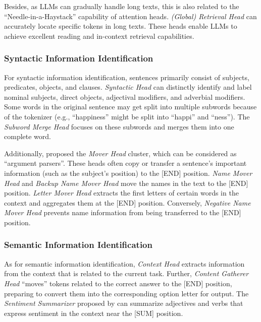 \documentclass[12pt,letterpaper]{article}
\begin{document}
Besides, as LLMs can gradually handle long texts, this is also related to the ``Needle-in-a-Haystack'' capability of attention heads. \textit{(Global) Retrieval Head} can accurately locate specific tokens in long texts.\citep{RetrievalHead_24_arXiv_PKU, GlobalAttention_24_arXiv_THU, RetrievalHead_24_arXiv_Huawei} These heads enable LLMs to achieve excellent reading and in-context retrieval capabilities.

\subsubsection*{Syntactic Information Identification} \label{subsubsec:syntactic}
For syntactic information identification, sentences primarily consist of subjects, predicates, objects, and clauses. \textit{Syntactic Head} can distinctly identify and label nominal subjects, direct objects, adjectival modifiers, and adverbial modifiers.
Some words in the original sentence may get split into multiple subwords because of the tokenizer (e.g., ``happiness'' might be split into ``happi'' and ``ness''). The \textit{Subword Merge Head} focuses on these subwords and merges them into one complete word.\citep{InformationFlow_24_arXiv_Meta,SubwordHead_19_ACL_Portugal}

Additionally, \citet{KnowledgeCircuit_24_arXiv_ZJU} proposed the \textit{Mover Head} cluster, which can be considered as ``argument parsers''. These heads often copy or transfer a sentence's important information (such as the subject's position) to the [END] position. 
\textit{Name Mover Head} and \textit{Backup Name Mover Head} move the names in the text to the [END] position.
\textit{Letter Mover Head} extracts the first letters of certain words in the context and aggregates them at the [END] position.\citep{AcronymPredict_24_arXiv_Alicante}
Conversely, \textit{Negative Name Mover Head} prevents name information from being transferred to the [END] position.\citep{IOI_23_ICLR_Redwood,CopySupression_23_arXiv_Google}

\subsubsection*{Semantic Information Identification} \label{subsubsec:semantic}
As for semantic information identification, \textit{Context Head} extracts information from the context that is related to the current task.\citep{KnowledgeConflict_24_arXiv_UCAS}
Further, \textit{Content Gatherer Head} ``moves'' tokens related to the correct answer to the [END] position, preparing to convert them into the corresponding option letter for output.\citep{CorrectLetterHead_23_arXiv_DeepMind,ColorObject_24_ICLR_BrownU}
The \textit{Sentiment Summarizer} proposed by \citet{Sentiment_23_arXiv_EleutherAI} can summarize adjectives and verbs that express sentiment in the context near the [SUM] position. 
\end{document}
